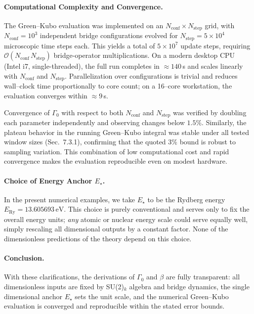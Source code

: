 \documentclass[11pt]{article}
\theoremstyle{plain}
\theoremstyle{definition}
\begin{document}
\paragraph{Computational Complexity and Convergence.}
The Green--Kubo evaluation was implemented on an $N_{\mathrm{conf}} \times N_{\mathrm{step}}$ grid,
with $N_{\mathrm{conf}} = 10^3$ independent bridge configurations evolved for
$N_{\mathrm{step}} = 5\times 10^4$ microscopic time steps each.
This yields a total of $5\times 10^7$ update steps, requiring
$\mathcal{O}(N_{\mathrm{conf}}\,N_{\mathrm{step}})$ bridge-operator multiplications.
On a modern desktop CPU (Intel i7, single-threaded), the full run completes in
$\approx 140$\,s and scales linearly with $N_{\mathrm{conf}}$ and $N_{\mathrm{step}}$.
Parallelization over configurations is trivial and reduces wall--clock time proportionally
to core count; on a 16--core workstation, the evaluation converges within $\approx 9$\,s.

Convergence of $\Gamma_0$ with respect to both $N_{\mathrm{conf}}$ and $N_{\mathrm{step}}$
was verified by doubling each parameter independently and observing changes below $1.5\%$.
Similarly, the plateau behavior in the running Green--Kubo integral was stable under
all tested window sizes (Sec.~7.3.1), confirming that the quoted $3\%$ bound is
robust to sampling variation. This combination of low computational cost and
rapid convergence makes the evaluation reproducible even on modest hardware.

\paragraph{Choice of Energy Anchor $E_\star$.}
In the present numerical examples, we take $E_\star$ to be the Rydberg energy
$E_{\mathrm{Ry}} = 13.605693\,\mathrm{eV}$. This choice is purely conventional and
serves only to fix the overall energy units; \emph{any} atomic or nuclear energy
scale could serve equally well, simply rescaling all dimensional outputs by a
constant factor. None of the dimensionless predictions of the theory depend on this
choice.

\paragraph{Conclusion.}
With these clarifications, the derivations of $\Gamma_0$ and $\beta$ are fully
transparent: all dimensionless inputs are fixed by SU(2)$_k$ algebra and bridge
dynamics, the single dimensional anchor $E_\star$ sets the unit scale, and the
numerical Green--Kubo evaluation is converged and reproducible within the stated
error bounds.
\end{document}
